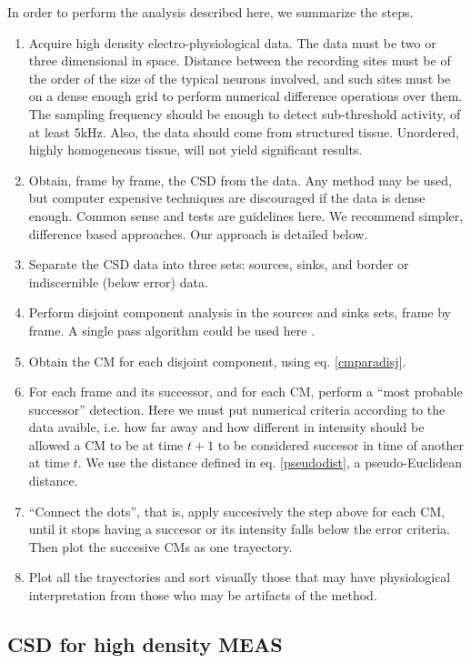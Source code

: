 \documentclass{article}
\begin{document}
 In order to perform the analysis described here, we summarize the steps.
 \begin{enumerate}
 \item Acquire high density electro-physiological data. The data must be two or three dimensional in space. Distance between the recording sites must be of the order of the size of the typical neurons involved, and such sites must be on a dense enough grid to perform numerical difference operations over them. The sampling frequency should be enough to detect sub-threshold activity, of at least 5kHz. Also, the data should come from structured tissue. Unordered, highly homogeneous tissue, will not yield significant results. 
\item Obtain, frame by frame, the CSD from the data. Any method may be used, but computer expensive techniques are discouraged if the data is dense enough. Common sense and tests are guidelines here. We recommend simpler, difference based approaches. Our approach is detailed below.
\item Separate the CSD data into three sets: sources, sinks, and border or indiscernible (below error) data.
\item Perform disjoint component analysis in the sources and sinks sets, frame by frame.
  A single pass algorithm could be used here \cite{Vincent91, Abubaker07}.
\item  Obtain the CM for each disjoint component, using eq. \ref{cmparadisj}.
\item For each frame and its successor, and for each CM, perform a ``most probable successor'' detection. Here we must put numerical criteria according to the data avaible, i.e. how far away and how different in intensity should be allowed a CM to be at time $t+1$ to be considered succesor in time of another at time $t$. We use the distance defined in eq. \ref{pseudodist}, a pseudo-Euclidean distance. 
\item ``Connect the dots'', that is, apply succesively the step above for each CM, until it stops having a succesor or its intensity falls below the error criteria. Then plot the succesive CMs as one trayectory.
  \item Plot all the trayectories and sort visually those that may have physiological interpretation from those who may be artifacts of the method. 
\end{enumerate}


\subsection{CSD for high density MEAS}
\end{document}
